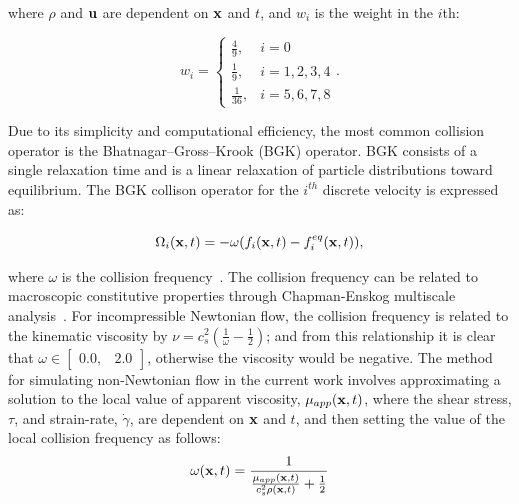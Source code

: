 \noindent where $\rho$ and $\mathbf{u}$ are dependent on $\mathbf{x}$ and $t$, and $w_i$ is the weight in the $i$th:%

\begin{equation} \label{eq:weights}
w_i = \begin{cases}
    \frac{4}{9}, & i = 0 \\
    \frac{1}{9}, & i = 1, 2, 3, 4 \\
    \frac{1}{36}, & i = 5, 6, 7, 8
\end{cases}.
\end{equation}

Due to its simplicity and computational efficiency, the most common collision operator is the Bhatnagar--Gross--Krook (BGK) operator.
BGK consists of a single relaxation time and is a linear relaxation of particle distributions toward equilibrium.
The BGK collison operator for the $i^{th}$ discrete velocity is expressed as:

\begin{equation} \label{eq:bgk}
\Omega_i(\mathbf{x}, t) = -\omega (f_i(\mathbf{x}, t) - f_i^{eq}(\mathbf{x}, t)),
\end{equation}

\noindent where $\omega$ is the collision frequency~\cite{Bha54}.
The collision frequency can be related to macroscopic constitutive properties through Chapman-Enskog multiscale analysis~\cite{wolf2000lattice}.
For incompressible Newtonian flow, the collision frequency is related to the kinematic viscosity by $\nu = c_s^2(\frac{1}{\omega} - \frac{1}{2})$; and from this relationship it is clear that $\omega \in \begin{bmatrix}0.0,& 2.0\end{bmatrix}$, otherwise the viscosity would be negative.
The method for simulating non-Newtonian flow in the current work involves approximating a solution to the local value of apparent viscosity, $\mu_{app}(\mathbf{x}, t)$, where the shear stress, $\tau$, and strain-rate, $\dot{\gamma}$, are dependent on $\mathbf{x}$ and $t$, and then setting the value of the local collision frequency as follows:
\begin{equation} \label{eq:colfreq-non-newtonian}
\omega(\mathbf{x}, t) = \frac{1}{\frac{\mu_{app}(\mathbf{x}, t)}{c_s^2 \rho(\mathbf{x}, t)} + \frac{1}{2}}
\end{equation}


